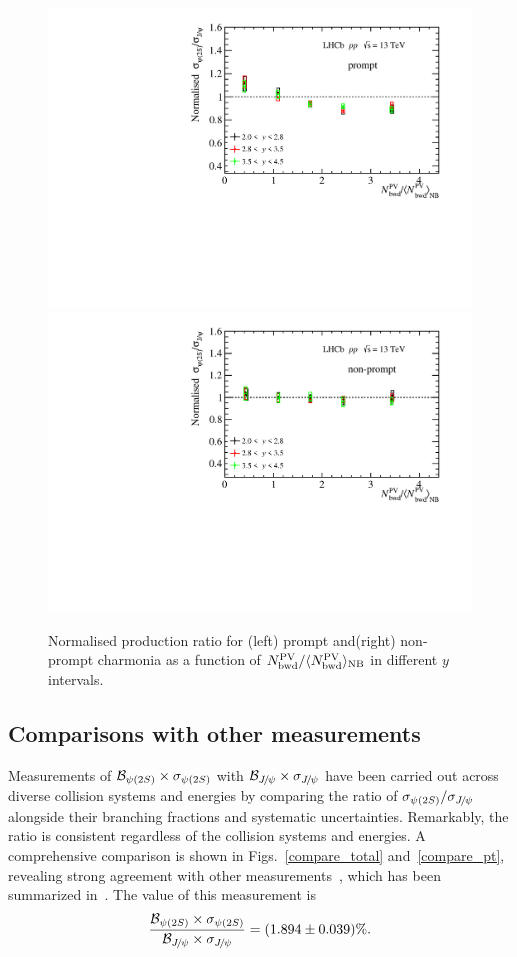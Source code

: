 \documentclass[12pt,a4paper]{article}
\begin{document}
\begin{figure}[H]
  \begin{center}
	  \vspace*{-0.5cm}
    \includegraphics[width=0.48\linewidth]{pdf/Result/promptRatioYB.pdf}
    \includegraphics[width=0.48\linewidth]{pdf/Result/frombRatioYB.pdf}
	  \vspace*{-0.5cm}
  \end{center}
	\caption{Normalised production ratio for (left) prompt and(right) non-prompt charmonia as a function of $N_{\rm bwd}^{\rm PV}/\langle N_{\rm bwd}^{\rm PV}\rangle_{\rm{NB}}$ in different $y$ intervals.}
  \label{RatioY_Back}
\end{figure}

\subsection{Comparisons with other measurements}
\label{Compare}
Measurements of ${\mathcal{B}}_{{\psi{(2S)}}}\times\sigma_{{\psi{(2S)}}}$ with ${\mathcal{B}}_{{{J\mskip -3mu/\mskip -2mu\psi}}}\times\sigma_{{{J\mskip -3mu/\mskip -2mu\psi}}}$ have been carried out across diverse collision systems and energies by comparing the ratio of $\sigma_{{\psi{(2S)}}}/\sigma_{{{J\mskip -3mu/\mskip -2mu\psi}}}$ alongside their branching fractions and systematic uncertainties. Remarkably, the ratio is consistent regardless of the collision systems and energies. A comprehensive comparison is shown in Figs.~\ref{compare_total} and~\ref{compare_pt}, revealing strong agreement with other measurements~\cite{PHENIX:2016vmz,NA50:2006rdp,PHENIX:2011gyb,E705:1992vec,NA51:1998uun,Clark:1978mg,UA1:1990eni,CDF:1997ykw,LHCb:2013nqs,CMS:2011rxs,ALICE:2017leg}, which has been summarized in~\cite{PHENIX:2016vmz}. The value of this measurement is
\begin{equation}
		\frac{{\mathcal{B}}_{{\psi{(2S)}}}\times\sigma_{{\psi{(2S)}}}}{{\mathcal{B}}_{{{J\mskip -3mu/\mskip -2mu\psi}}}\times\sigma_{{{J\mskip -3mu/\mskip -2mu\psi}}}} = (1.894\pm0.039)\%.
\end{equation}
\end{document}
